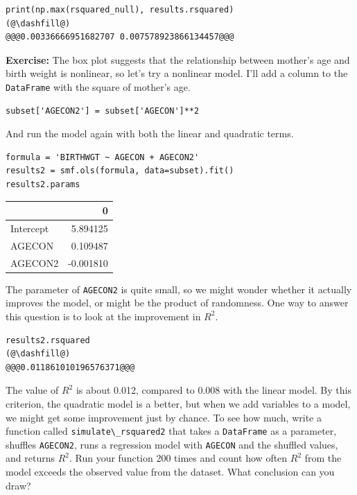 \begin{lstlisting}[]
print(np.max(rsquared_null), results.rsquared)
(@\dashfill@)
@@@0.00336666951682707 0.007578923866134457@@@
\end{lstlisting}

\textbf{Exercise:} The box plot suggests that the relationship between
mother's age and birth weight is nonlinear, so let's try a nonlinear
model. I'll add a column to the \passthrough{\lstinline!DataFrame!} with
the square of mother's age.

\begin{lstlisting}[]
subset['AGECON2'] = subset['AGECON']**2
\end{lstlisting}

And run the model again with both the linear and quadratic terms.

\begin{lstlisting}[]
formula = 'BIRTHWGT ~ AGECON + AGECON2'
results2 = smf.ols(formula, data=subset).fit()
results2.params
\end{lstlisting}

\begin{tabular}{lr}
\midrule
{} &         0 \\
\midrule
Intercept &  5.894125 \\
AGECON    &  0.109487 \\
AGECON2   & -0.001810 \\
\midrule
\end{tabular}

The parameter of \passthrough{\lstinline!AGECON2!} is quite small, so we
might wonder whether it actually improves the model, or might be the
product of randomness. One way to answer this question is to look at the
improvement in \(R^2\).

\begin{lstlisting}[]
results2.rsquared
(@\dashfill@)
@@@0.011861010196576371@@@
\end{lstlisting}

The value of \(R^2\) is about 0.012, compared to 0.008 with the linear
model. By this criterion, the quadratic model is a better, but when we
add variables to a model, we might get some improvement just by chance.
To see how much, write a function called
\passthrough{\lstinline!simulate\_rsquared2!} that takes a
\passthrough{\lstinline!DataFrame!} as a parameter, shuffles
\passthrough{\lstinline!AGECON2!}, runs a regression model with
\passthrough{\lstinline!AGECON!} and the shuffled values, and returns
\(R^2\). Run your function 200 times and count how often \(R^2\) from
the model exceeds the observed value from the dataset. What conclusion
can you draw?

